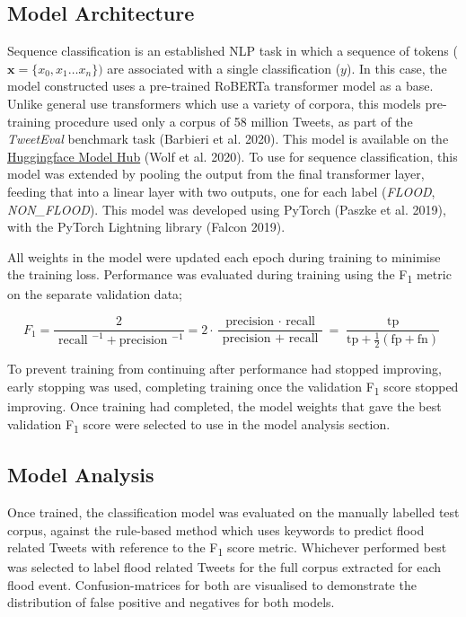 \documentclass[a4paper, notitlepage]{extreport}
\begin{document}
\hypertarget{model-architecture}{%
\subsection{Model Architecture}\label{model-architecture}}

Sequence classification is an established NLP task in which a sequence
of tokens (\(\mathbf{x} = \{x_{0}, x_{1}\dots x_{n}\})\) are associated
with a single classification (\(\mathit{y}\)). In this case, the model
constructed uses a pre-trained RoBERTa transformer model as a base.
Unlike general use transformers which use a variety of corpora, this
models pre-training procedure used only a corpus of 58 million Tweets,
as part of the \emph{TweetEval} benchmark task (Barbieri et al. 2020).
This model is available on the
\href{https://huggingface.co/cardiffnlp/twitter-roberta-base}{Huggingface
Model Hub} (Wolf et al. 2020). To use for sequence classification, this
model was extended by pooling the output from the final transformer
layer, feeding that into a linear layer with two outputs, one for each
label (\emph{FLOOD}, \emph{NON\_FLOOD}). This model was developed using
PyTorch (Paszke et al. 2019), with the PyTorch Lightning library (Falcon
2019).

All weights in the model were updated each epoch during training to
minimise the training loss. Performance was evaluated during training
using the F\textsubscript{1} metric on the separate validation data;

\[
F_{1}=\frac{2}{\text { recall }^{-1}+\text {precision }^{-1}}=2 \cdot \frac{\text { precision } \cdot \text { recall }}{\text { precision }+\text { recall }}=\frac{\operatorname{tp}}{\mathrm{tp}+\frac{1}{2}(\mathrm{fp}+\mathrm{fn})}
\]

To prevent training from continuing after performance had stopped
improving, early stopping was used, completing training once the
validation F\textsubscript{1} score stopped improving. Once training had
completed, the model weights that gave the best validation
F\textsubscript{1} score were selected to use in the model analysis
section.

\hypertarget{model-analysis}{%
\subsection{Model Analysis}\label{model-analysis}}

Once trained, the classification model was evaluated on the manually
labelled test corpus, against the rule-based method which uses keywords
to predict flood related Tweets with reference to the F\textsubscript{1}
score metric. Whichever performed best was selected to label flood
related Tweets for the full corpus extracted for each flood event.
Confusion-matrices for both are visualised to demonstrate the
distribution of false positive and negatives for both models.
\end{document}
